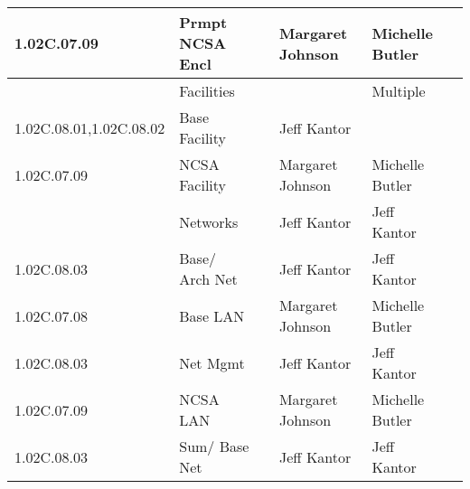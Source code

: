 \begin{longtable}{|p{}|p{}|p{}|p{}|p{}|p{}|}
1.02C.07.09 &  Prmpt NCSA Encl &  & Margaret Johnson & Michelle Butler & \\ \hline
 &  Facilities &  &  & Multiple & \\ \hline
1.02C.08.01,1.02C.08.02 &  Base Facility &  & Jeff Kantor &  & \\ \hline
1.02C.07.09 &  NCSA Facility &  & Margaret Johnson & Michelle Butler & \\ \hline
 &  Networks &  & Jeff Kantor & Jeff Kantor & \\ \hline
1.02C.08.03 &  Base/ Arch Net &  & Jeff Kantor & Jeff Kantor & \\ \hline
1.02C.07.08 &  Base LAN &  & Margaret Johnson & Michelle Butler & \\ \hline
1.02C.08.03 &  Net Mgmt &  & Jeff Kantor & Jeff Kantor & \\ \hline
1.02C.07.09 &  NCSA LAN &  & Margaret Johnson & Michelle Butler & \\ \hline
1.02C.08.03 &  Sum/ Base Net &  & Jeff Kantor & Jeff Kantor & \\ \hline
\end{longtable}
\normalsize
